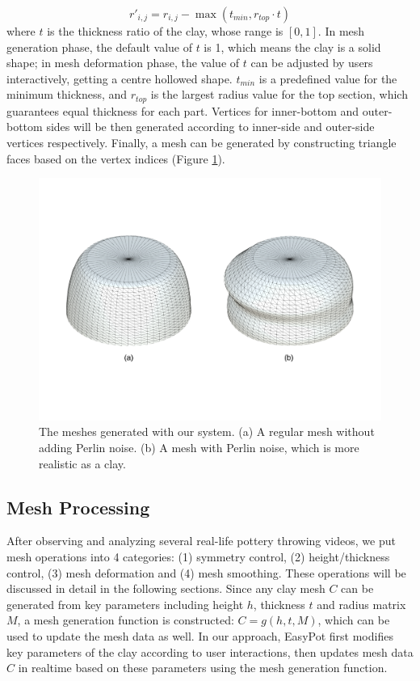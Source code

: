 \documentclass{svjour3}                     %
\begin{document}
\begin{equation}
r'_{i,j} = r_{i,j} - \max(t_{min}, r_{top} \cdot t)
\end{equation}
where $t$ is the thickness ratio of the clay, whose range is $[0,1]$. In mesh generation phase, the default value of $t$ is 1, which means the clay is a solid shape; in mesh deformation phase, the value of $t$ can be adjusted by users interactively, getting a centre hollowed shape. $t_{min}$ is a predefined value for the minimum thickness, and $r_{top}$ is the largest radius value for the top section, which guarantees equal thickness for each part.
Vertices for inner-bottom and outer-bottom sides will be then generated according to inner-side and outer-side vertices respectively. Finally, a mesh can be generated by constructing triangle faces based on the vertex indices (Figure \ref{fig:mesh}).

\begin{figure}
\includegraphics[width=\textwidth]{fig6}
\caption{The meshes generated with our system. (a) A regular mesh without adding Perlin noise. (b) A mesh with Perlin noise, which is more realistic as a clay.}
\label{fig:mesh}
\end{figure}

\subsection{Mesh Processing}
\label{sec:4.2}
After observing and analyzing several real-life pottery throwing videos, we put mesh operations into 4 categories: (1) symmetry control, (2) height/thickness control, (3) mesh deformation and (4) mesh smoothing. These operations will be discussed in detail in the following sections.
Since any clay mesh $C$ can be generated from key parameters including height $h$, thickness $t$ and radius matrix $M$, a mesh generation function is constructed: $ C =  g(h, t, M) $, which can be used to update the mesh data as well.
In our approach, EasyPot first modifies key parameters of the clay according to user interactions, then updates mesh data $C$  in realtime based on these parameters using the mesh generation function.
\end{document}

